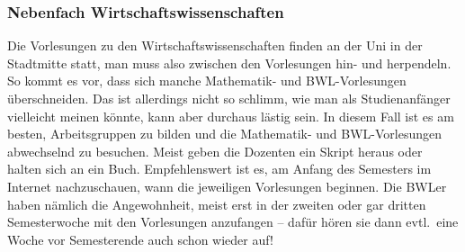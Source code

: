 \subsubsection{Nebenfach Wirtschaftswissenschaften}

Die Vorlesungen zu den Wirtschaftswissenschaften
finden an der Uni in der Stadtmitte statt,
man muss also zwischen den Vorlesungen hin- und herpendeln.
So kommt es vor, dass sich manche Mathematik-
und BWL-Vorlesungen überschneiden.
Das ist allerdings nicht so schlimm,
wie man als Studienanfänger vielleicht meinen könnte,
kann aber durchaus lästig sein.
In diesem Fall ist es am besten,
Arbeitsgruppen zu bilden und die Mathematik-
und BWL-Vorlesungen abwechselnd zu besuchen.
Meist geben die Dozenten ein Skript heraus
oder halten sich an ein Buch.
Empfehlenswert ist es, am Anfang des Semesters
im Internet nachzuschauen,
wann die jeweiligen Vorlesungen beginnen.
Die BWLer haben nämlich die Angewohnheit,
meist erst in der zweiten oder gar dritten Semesterwoche
mit den Vorlesungen anzufangen -- dafür hören sie dann evtl.\ eine Woche vor
Semesterende auch schon wieder auf!

%

\begin{center}
\end{center}

